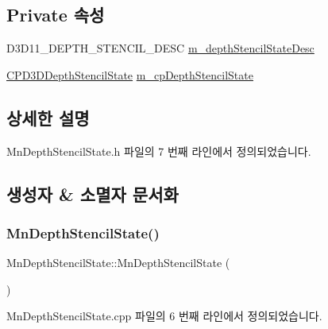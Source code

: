 \subsection*{Private 속성}
\begin{DoxyCompactItemize}
\item 
D3\+D11\+\_\+\+D\+E\+P\+T\+H\+\_\+\+S\+T\+E\+N\+C\+I\+L\+\_\+\+D\+E\+SC \hyperlink{class_m_n_l_1_1_mn_depth_stencil_state_a1d4dc90b80e4f447f6a64a8cfcd53c72}{m\+\_\+depth\+Stencil\+State\+Desc}
\item 
\hyperlink{namespace_m_n_l_a8209b06065c025e5d6bc2e8ee5925faf}{C\+P\+D3\+D\+Depth\+Stencil\+State} \hyperlink{class_m_n_l_1_1_mn_depth_stencil_state_a23bb91aaa4077752afe743a2385a04bc}{m\+\_\+cp\+Depth\+Stencil\+State}
\end{DoxyCompactItemize}


\subsection{상세한 설명}


Mn\+Depth\+Stencil\+State.\+h 파일의 7 번째 라인에서 정의되었습니다.



\subsection{생성자 \& 소멸자 문서화}
\mbox{\label{class_m_n_l_1_1_mn_depth_stencil_state_ac8c5a5415f93b0a54837bcfd88e36ab3}} 
\subsubsection{\texorpdfstring{Mn\+Depth\+Stencil\+State()}{MnDepthStencilState()}}
{\footnotesize\ttfamily Mn\+Depth\+Stencil\+State\+::\+Mn\+Depth\+Stencil\+State (\begin{DoxyParamCaption}{ }\end{DoxyParamCaption})}



Mn\+Depth\+Stencil\+State.\+cpp 파일의 6 번째 라인에서 정의되었습니다.

\mbox{\label{class_m_n_l_1_1_mn_depth_stencil_state_a69ad219841e29b837080c7d35d6345b8}} 
